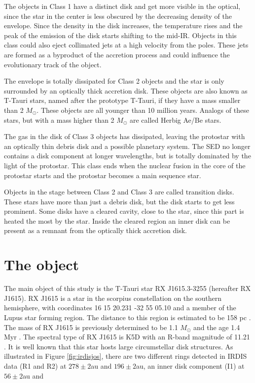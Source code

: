 \documentclass[twoside,single,12pt]{lion-msc}
\begin{document}
The objects in Class 1 have a distinct disk and get more visible in the optical, since the star in the center is less obscured by the decreasing density of the envelope. Since the density in the disk increases, the temperature rises and the peak of the emission of the disk starts shifting to the mid-IR. Objects in this class could also eject collimated jets at a high velocity from the poles. These jets are formed as a byproduct of the accretion process and could influence the evolutionary track of the object.
\bigskip

The envelope is totally dissipated for Class 2 objects and the star is only surrounded by an optically thick accretion disk. These objects are also known as T-Tauri stars, named after the prototype T-Tauri, if they have a mass smaller than 2 $M_\odot$. These objects are all younger than 10 million years. Analogs of these stars, but with a mass higher than 2 $M_\odot$ are called Herbig Ae/Be stars. 
\bigskip

The gas in the disk of Class 3 objects has dissipated, leaving the protostar with an optically thin debris disk and a possible planetary system. The SED no longer contains a disk component at longer wavelengths, but is totally dominated by the light of the protostar. This class ends when the nuclear fusion in the core of the protostar starts and the protostar becomes a main sequence star.
\bigskip

Objects in the stage between Class 2 and Class 3 are called transition disks. These stars  have more than just a debris disk, but the disk starts to get less prominent. Some disks have a cleared cavity, close to the star, since this part is heated the most by the star. Inside the cleared region an inner disk can be present as a remnant from the optically thick accretion disk.

\section{The object}
The main object of this study is the T-Tauri star RX J1615.3-3255 (hereafter RX J1615). RX J1615 is a star in the scorpius constellation on the southern hemisphere, with coordinates 16 15 20.231 -32 55 05.10 and a member of the Lupus star forming region. The distance to this region is estimated to be 158 pc \cite{Gaia2018}. The mass of RX J1615 is previously determined to be 1.1 $M_\odot$ and the age 1.4 Myr \cite{Wahhaj2010}. The spectral type of RX J1615 is K5D with an R-band magnitude of 11.21 \cite{Krautter1997}. It is well known that this star hosts large circumstellar disk structures. As illustrated in Figure \ref{fig:irdisjos}, there are two different rings detected in IRDIS data (R1 and R2) at $278\pm 2$au and $196\pm 2$au, an inner disk component (I1) at $56\pm 2$au and {\par}
\end{document}
